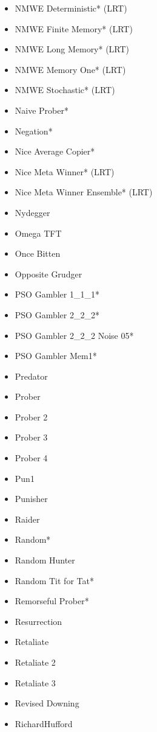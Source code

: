 \begin{appendices}
\begin{multicols}{4}
\begin{itemize}
            \item NMWE Deterministic* (LRT)
            \item NMWE Finite Memory* (LRT)
            \item NMWE Long Memory* (LRT)
            \item NMWE Memory One* (LRT)
            \item NMWE Stochastic* (LRT)
            \item Naive Prober*
            \item Negation*
            \item Nice Average Copier*
            \item Nice Meta Winner* (LRT)
            \item Nice Meta Winner Ensemble* (LRT)
            \item Nydegger
            \item Omega TFT
            \item Once Bitten
            \item Opposite Grudger
            \item PSO Gambler 1\_1\_1*
            \item PSO Gambler 2\_2\_2*
            \item PSO Gambler 2\_2\_2 Noise 05*
            \item PSO Gambler Mem1*
            \item Predator
            \item Prober
            \item Prober 2
            \item Prober 3
            \item Prober 4
            \item Pun1
            \item Punisher
            \item Raider
            \item Random*
            \item Random Hunter
            \item Random Tit for Tat*
            \item Remorseful Prober*
            \item Resurrection
            \item Retaliate
            \item Retaliate 2
            \item Retaliate 3
            \item Revised Downing
            \item RichardHufford

\end{itemize}
\end{multicols}
\end{appendices}
